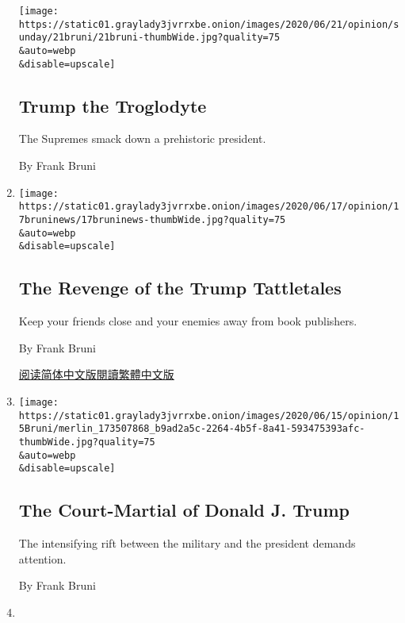 \begin{enumerate}
  \texttt{[image: https://static01.graylady3jvrrxbe.onion/images/2020/06/21/opinion/sunday/21bruni/21bruni-thumbWide.jpg?quality=75\\\&auto=webp\\\&disable=upscale]}

  \hypertarget{trump-the-troglodyte}{%
  \subsection{Trump the Troglodyte}\label{trump-the-troglodyte}}

  The Supremes smack down a prehistoric president.

  By Frank Bruni
\item
  \href{/2020/06/17/opinion/trump-mary-book.html}{}

  \texttt{[image: https://static01.graylady3jvrrxbe.onion/images/2020/06/17/opinion/17bruninews/17bruninews-thumbWide.jpg?quality=75\\\&auto=webp\\\&disable=upscale]}

  \hypertarget{the-revenge-of-the-trump-tattletales}{%
  \subsection{The Revenge of the Trump
  Tattletales}\label{the-revenge-of-the-trump-tattletales}}

  Keep your friends close and your enemies away from book publishers.

  By Frank Bruni

  \href{https://cn.nytimes3xbfgragh.onion/opinion/20200622/trump-mary-book/}{阅读简体中文版}\href{https://cn.nytimes3xbfgragh.onion/opinion/20200622/trump-mary-book/zh-hant/}{閱讀繁體中文版}
\item
  \href{/2020/06/15/opinion/trump-military.html}{}

  \texttt{[image: https://static01.graylady3jvrrxbe.onion/images/2020/06/15/opinion/15Bruni/merlin\_173507868\_b9ad2a5c-2264-4b5f-8a41-593475393afc-thumbWide.jpg?quality=75\\\&auto=webp\\\&disable=upscale]}

  \hypertarget{the-court-martial-of-donald-j-trump}{%
  \subsection{The Court-Martial of Donald J.
  Trump}\label{the-court-martial-of-donald-j-trump}}

  The intensifying rift between the military and the president demands
  attention.

  By Frank Bruni
\item
  \href{/2020/06/04/opinion/sunday/coronavirus-college-humanities.html}{}


\end{enumerate}
